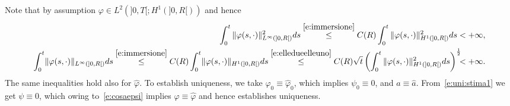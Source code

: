 \documentclass[11pt,leqno]{amsart}
\numberwithin{equation}{section}
\begin{document}
Note that by assumption ${\varphi} \in L^2 (]0, T[; H^1 (]0, R[))$ and hence 
\begin{eqnarray*}
  \int_0^t   \| {\varphi} (s, \cdot) \|^2_{L^\infty (]0, R[)} ds 
  \stackrel{\eqref{e:immersione}}{\leq} C(R)
  \int_0^t  \| {\varphi} (s, \cdot) \|^2_{H^1 (]0, R[)}  
  ds < + \infty, 
  \\
  \int_0^t   \! \| {\varphi}(s, \cdot) \|_{L^\infty (]0, R[)} ds 
  \stackrel{\eqref{e:immersione}}{\leq} C(R)
  \int_0^t  \! \| {\varphi}(s, \cdot) \|_{H^1(]0, R[)} ds
  \stackrel{\eqref{e:elledueelleuno}}{\leq} C(R) \sqrt{t}
  \left( \int_0^t   \| {\varphi}(s, \cdot) \|^2_{H^1(]0, R[)} ds\right)^{\frac{1}{2}}
  \! \!\!<+\infty.
\end{eqnarray*}
The same inequalities hold also for $\hat {\varphi}$.
To establish uniqueness, we take ${\varphi}_0 \equiv \hat {\varphi}_0$, which implies $\psi_0 \equiv 0$, and $a \equiv \hat a$.  From~\eqref{e:uni:stima1} we get $\psi \equiv 0$, which owing to~\eqref{e:cosaepsi} implies ${\varphi} \equiv \hat {\varphi}$ and hence establishes uniqueness. 
\end{document}
